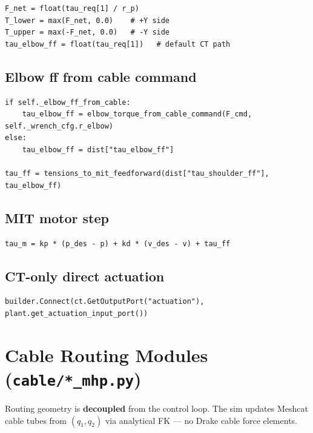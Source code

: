 \documentclass[11pt,a4paper]{article}
\begin{document}
\begin{lstlisting}[style=python, caption={controller/cable\_wrench\_mhp.py}]
F_net = float(tau_req[1] / r_p)
T_lower = max(F_net, 0.0)    # +Y side
T_upper = max(-F_net, 0.0)   # -Y side
tau_elbow_ff = float(tau_req[1])   # default CT path
\end{lstlisting}

\subsection{Elbow ff from cable command}

\begin{lstlisting}[style=python, caption={controller/mhp\_cable\_framework.py (\_solve)}]
if self._elbow_ff_from_cable:
    tau_elbow_ff = elbow_torque_from_cable_command(F_cmd, self._wrench_cfg.r_elbow)
else:
    tau_elbow_ff = dist["tau_elbow_ff"]

tau_ff = tensions_to_mit_feedforward(dist["tau_shoulder_ff"], tau_elbow_ff)
\end{lstlisting}

\subsection{MIT motor step}

\begin{lstlisting}[style=python, caption={actuators/dummy\_mit\_motor.py}]
tau_m = kp * (p_des - p) + kd * (v_des - v) + tau_ff
\end{lstlisting}

\subsection{CT-only direct actuation}

\begin{lstlisting}[style=python, caption={cable/simulation\_mhp\_ct.py}]
builder.Connect(ct.GetOutputPort("actuation"), plant.get_actuation_input_port())
\end{lstlisting}

\section{Cable Routing Modules (\texttt{cable/*\_mhp.py})}

Routing geometry is \textbf{decoupled} from the control loop.  The sim updates
Meshcat cable tubes from $(q_1,q_2)$ via analytical FK --- no Drake cable force elements.
\end{document}
